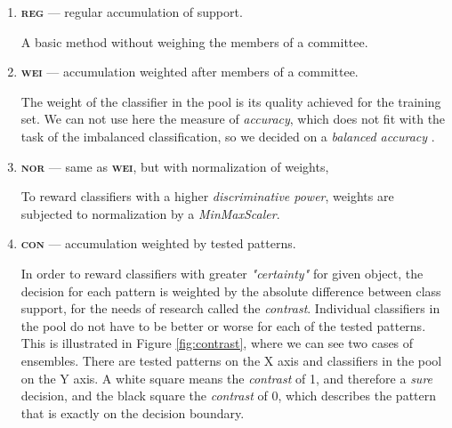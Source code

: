 \documentclass[pmlr]{jmlr}
\begin{document}
\begin{enumerate}
	\item \textbf{\textsc{reg}} --- regular accumulation of support.

A basic method without weighing the members of a committee.

	\item \textbf{\textsc{wei}} --- accumulation weighted after members of a committee.

The weight of the classifier in the pool is its quality achieved for the training set. We can not use here the measure of \emph{accuracy}, which does not fit with the task of the imbalanced classification, so we decided on a \emph{balanced accuracy} \citep{brodersen2010balanced}.

	\item \textbf{\textsc{nor}} --- same as \textbf{\textsc{wei}}, but with normalization of weights,

To reward classifiers with a higher \emph{discriminative power}, weights are subjected to normalization by a \emph{MinMaxScaler}.
	
	\item \textbf{\textsc{con}} --- accumulation weighted by tested patterns.
	
In order to reward classifiers with greater \emph{"certainty"} for given object, the decision for each pattern is weighted by the absolute difference between class support, for the needs of research called the \emph{contrast}. Individual classifiers in the pool do not have to be better or worse for each of the tested patterns. This is illustrated in Figure \ref{fig:contrast}, where we can see two cases of ensembles. There are tested patterns on the X axis and classifiers in the pool on the Y axis. A white square means the \emph{contrast} of 1, and therefore a \emph{sure} decision, and the black square the \emph{contrast} of 0, which describes the pattern that is exactly on the decision boundary.
	

\end{enumerate}
\end{document}
